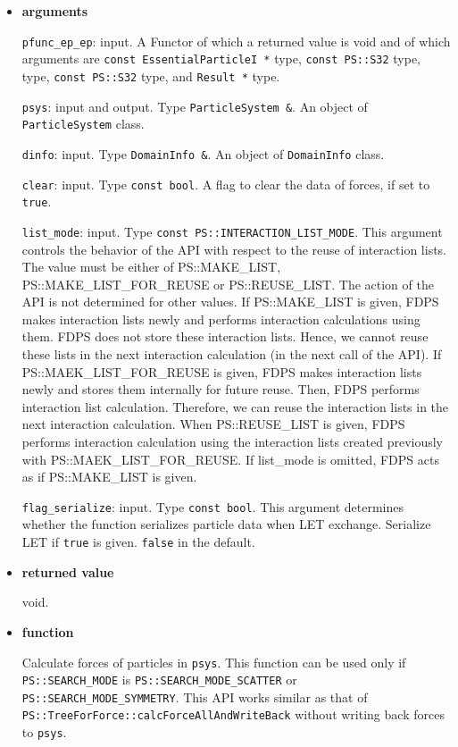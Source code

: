 \begin{itemize}

\item {\bf arguments}

{\tt pfunc\_ep\_ep}: input. A Functor of which a returned value is
void and of which arguments are {\tt const EssentialParticleI *} type, {\tt const PS::S32} type,  type, {\tt const PS::S32} type, and {\tt Result *} type.

{\tt psys}: input and output. Type {\tt ParticleSystem \&}. An object of {\tt ParticleSystem} class.

{\tt dinfo}: input. Type {\tt DomainInfo \&}. An object of {\tt DomainInfo} class.

{\tt clear}: input. Type {\tt const bool}. A flag to clear the data of forces, if set to {\tt true}.

{\tt list\_mode}: input. Type {\tt const PS::INTERACTION\_LIST\_MODE}. This argument controls the behavior of the API with respect to the reuse of interaction lists. The value must be either of PS::MAKE\_LIST, PS::MAKE\_LIST\_FOR\_REUSE or PS::REUSE\_LIST. The action of the API is not determined for other values. If PS::MAKE\_LIST is given, FDPS makes interaction lists newly and performs interaction calculations using them. FDPS does not store these interaction lists. Hence, we cannot reuse these lists in the next interaction calculation (in the next call of the API). If PS::MAEK\_LIST\_FOR\_REUSE is given, FDPS makes interaction lists newly and stores them internally for future reuse. Then, FDPS performs interaction list calculation. Therefore, we can reuse the interaction lists in the next interaction calculation. When PS::REUSE\_LIST is given, FDPS performs interaction calculation using the interaction lists created previously with PS::MAEK\_LIST\_FOR\_REUSE. If list\_mode is omitted, FDPS acts as if PS::MAKE\_LIST is given.

\texttt{flag\_serialize}: input. Type \texttt{const bool}. This argument determines whether the function serializes particle data when LET exchange. Serialize LET if \texttt{true} is given. \texttt{false} in the default.

\item {\bf returned value}

void.

\item {\bf function}

Calculate forces of particles in {\tt psys}. This function can be used only if {\tt PS::SEARCH\_MODE} is {\tt PS::SEARCH\_MODE\_SCATTER} or {\tt PS::SEARCH\_MODE\_SYMMETRY}. This API works similar as that of {\tt PS::TreeForForce::calcForceAllAndWriteBack} without writing back forces to {\tt psys}.


\end{itemize}
